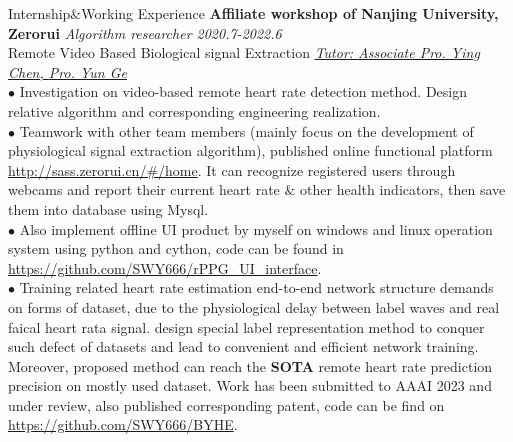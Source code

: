 \documentclass{resume} %
\begin{document}
\begin{rSection}{Internship$\&$Working Experience}
    {\bf Affiliate workshop of Nanjing University, Zerorui} \hfill {\em Algorithm researcher 2020.7-2022.6} \\
    Remote Video Based Biological signal Extraction \hfill {\em \href{{https://ese.nju.edu.cn/cy/list.psp}}{Tutor: Associate Pro. Ying Chen, }}{\em \href{{https://ese.nju.edu.cn/gy/list.psp}}{Pro. Yun Ge}} \\
    {$\bullet$ Investigation on video-based remote heart rate detection method. Design relative algorithm and corresponding engineering realization. \\
    $\bullet$ Teamwork with other team members (mainly focus on the development of physiological signal extraction algorithm), published online functional platform \url{http://sass.zerorui.cn/#/home}. It can recognize registered users through webcams and report their current heart rate $\&$ other health indicators, then save them into database using Mysql. \\
    $\bullet$ Also implement offline UI product by myself on windows and linux operation system using python and cython, code can be found in \url{https://github.com/SWY666/rPPG_UI_interface}. \\
    $\bullet$ Training related heart rate estimation end-to-end network structure demands on forms of dataset, due to the physiological delay between label waves and real faical heart rata signal.   design special label representation method to conquer such defect of datasets and lead to convenient and efficient network training. Moreover, proposed method can reach the \textbf{SOTA} remote heart rate prediction precision on mostly used dataset. Work has been submitted to AAAI 2023 and under review, also published corresponding patent, code can be find on \url{https://github.com/SWY666/BYHE}.}
\end{rSection}
\end{document}
